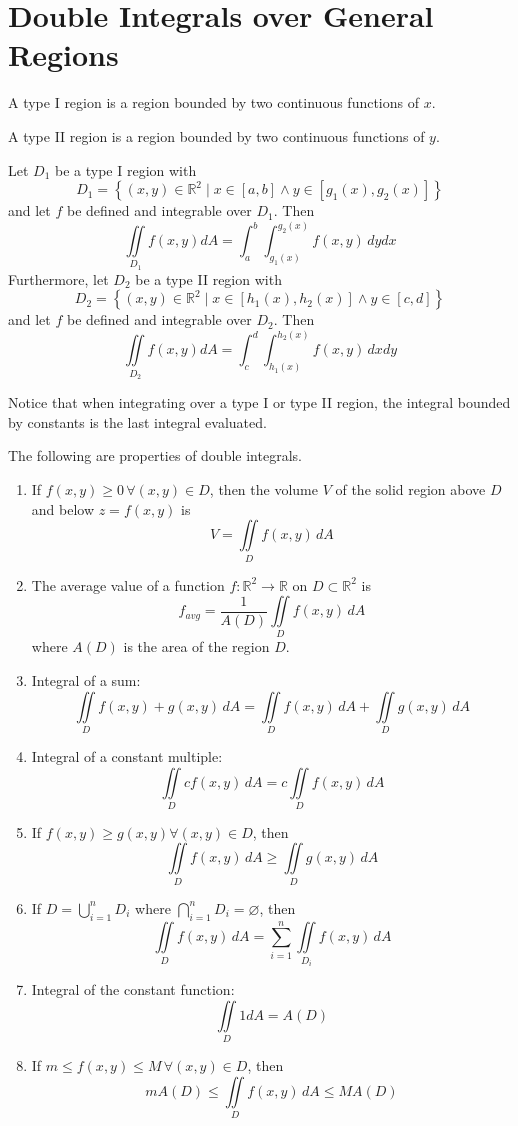 \section{Double Integrals over General Regions}
\begin{definition}
    A type I region is a region bounded by two continuous functions of \(x\).
\end{definition}
\begin{definition}
    A type II region is a region bounded by two continuous functions of \(y\).
\end{definition}
\begin{definition}
    Let \(D_1\) be a type I region with
    \[
        D_1=\left\{ (x,y)\in\mathbb{R}^2 \mid x\in[a,b]\land y\in[g_1(x),g_2(x)] \right\} 
    \]
    and let \(f\) be defined and integrable over \(D_1\). Then 
    \[
        \iint\limits_{D_1}f(x,y)dA = \int_a^b \int_{g_1(x)}^{g_2(x)}f(x,y)\,dydx
    \]
    Furthermore, let \(D_2\) be a type II region with
    \[
        D_2 =\left\{ (x,y)\in\mathbb{R}^2\mid x\in[h_1(x),h_2(x)]\land y\in[c,d] \right\}
    \]
    and let \(f\) be defined and integrable over \(D_2\). Then 
    \[
        \iint\limits_{D_2}f(x,y)dA=\int_c^{d}\int_{h_1(x)}^{h_2(x)}f(x,y)\,dxdy 
    \]
\end{definition}
\begin{remark}
    Notice that when integrating over a type I or type II region, the integral bounded by constants is the last integral evaluated.
\end{remark}
The following are properties of double integrals.
\begin{enumerate}
    \item If \(f(x,y)\geq 0\, \forall (x,y)\in D\), then the volume \(V\) of the solid region above \(D\) and below \(z=f(x,y)\) is
    \[
        V=\iint\limits_{D}f(x,y)\,dA
    \]
    \item The average value of a function \(f:\mathbb{R} ^2\to \mathbb{R} \) on \(D \subset \mathbb{R} ^2\) is
    \[
        f_{avg}=\frac{1}{A(D)}\iint\limits_{D}f(x,y)\,dA 
    \]
    where \(A(D)\) is the area of the region \(D\).
    \item Integral of a sum:
    \[
        \iint\limits_{D}f(x,y)+g(x,y)\,dA = \iint\limits_{D}f(x,y)\,dA + \iint\limits_{D}g(x,y)\,dA
    \]
    \item Integral of a constant multiple:
    \[
        \iint\limits_{D}cf(x,y)\,dA = c\iint\limits_{D}f(x,y)\,dA
    \]
    \item If \(f(x,y)\geq g(x,y)\forall (x,y)\in D\), then
    \[
        \iint\limits_{D}f(x,y)\,dA \geq \iint\limits_{D}g(x,y)\,dA
    \]
    \item If \(D = \bigcup_{i=1}^n D_i \) where \(\bigcap_{i=1}^{n}D_i = \varnothing  \), then
    \[
        \iint\limits_{D}f(x,y)\,dA= \sum_{i=1}^n \iint\limits_{D_i}f(x,y)\,dA
    \]
    \item Integral of the constant function:
    \[
        \iint\limits_{D}1dA=A(D)
    \]
    \item If \(m\leq f(x,y)\leq M\,\forall (x,y)\in D\), then
    \[
        mA(D)\leq \iint\limits_{D}f(x,y)\,dA\leq MA(D)
    \]
\end{enumerate}
